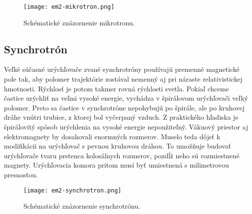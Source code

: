 \documentclass[../../main.tex]{subfiles}
\begin{document}
\begin{figure}[h]
\centering
\texttt{[image: em2-mikrotron.png]}
\caption{Schématické znázornenie mikrotronu.}
\label{em2:img:mikrotron}
\end{figure}

\subsection{Synchrotrón}

Veľké súčasné urýchľovače zvané synchrotróny používajú premenné magnetické pole tak, aby polomer trajektórie zostával nemenný aj pri náraste relativistickej hmotnosti. Rýchlosť je potom takmer rovná rýchlosti svetla. Pokiaľ chceme častice urýchliť na veľmi vysoké energie, vychádza v špirálovom urýchľovači veľký polomer. Preto sa častice v synchrotróne nepohybujú po špirále, ale po kruhovej dráhe vnútri trubice, z ktorej bol vyčerpaný vzduch. Z praktického hľadiska je špirálovitý spôsob urýchlenia na vysoké energie nepoužiteľný. Vákuový priestor aj elektromagnety by dosahovali enormných rozmerov. Muselo teda dôjsť k modifikácii na urýchľovač s pevnou kruhovou dráhou. To umožňuje budovať urýchľovače tvaru prstenca kolosálnych rozmerov, pozdĺž neho sú rozmiestnené magnety. Urýchľovacia komora pritom musí byť umiestnená s milimetrovou presnosťou.

\begin{figure}[h]
\centering
\texttt{[image: em2-synchrotron.png]}
\caption{Schématické znázornenie synchrotrónu.}
\label{em2:img:synchrotron}
\end{figure}
\end{document}
